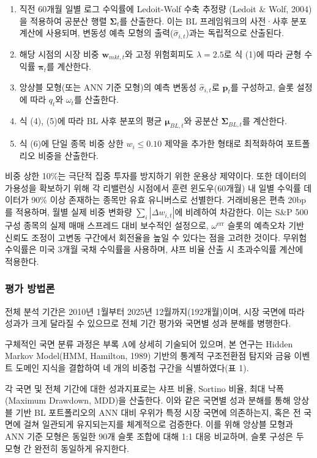\documentclass{article}
\begin{document}
\begin{enumerate}
  \item 직전 60개월 일별 로그 수익률에 Ledoit-Wolf 수축 추정량 (Ledoit & Wolf, 2004)을 적용하여 공분산 행렬 $\boldsymbol{\Sigma}_t$를 산출한다. 이는 BL 프레임워크의 사전·사후 분포 계산에 사용되며, 변동성 예측 모형의 출력($\hat{\sigma}_{i,t}$)과는 독립적으로 산출된다.
  \item 해당 시점의 시장 비중 $\mathbf{w}_{mkt,t}$와 고정 위험회피도 $\lambda = 2.5$로 식 (1)에 따라 균형 수익률 $\boldsymbol{\pi}_t$를 계산한다.
  \item 앙상블 모형(또는 ANN 기준 모형)의 예측 변동성 $\hat{\sigma}_{i,t}$로 $\mathbf{p}_t$를 구성하고, 슬롯 설정에 따라 $q_t$와 $\omega_t$를 산출한다.
  \item 식 (4), (5)에 따라 BL 사후 분포의 평균 $\boldsymbol{\mu}_{BL,t}$와 공분산 $\boldsymbol{\Sigma}_{BL,t}$를 계산한다.
  \item 식 (6)에 단일 종목 비중 상한 $w_i \leq 0.10$ 제약을 추가한 형태로 최적화하여 포트폴리오 비중을 산출한다.
\end{enumerate}

비중 상한 10\%는 극단적 집중 투자를 방지하기 위한 운용상 제약이다. 또한 데이터의 가용성을 확보하기 위해 각 리밸런싱 시점에서 훈련 윈도우(60개월) 내 일별 수익률 데이터가 90\% 이상 존재하는 종목만 유효 유니버스로 선별한다. 거래비용은 편측 20bp를 적용하며, 월별 실제 비중 변화량 $\sum_i |\Delta w_{i,t}|$에 비례하여 차감한다. 이는 S\&P 500 구성 종목의 실제 매매 스프레드 대비 보수적인 설정으로, $\omega^{\mathrm{err}}$ 슬롯의 예측오차 기반 신뢰도 조정이 고변동 구간에서 회전율을 높일 수 있다는 점을 고려한 것이다. 무위험 수익률은 미국 3개월 국채 수익률을 사용하며, 샤프 비율 산출 시 초과수익률 계산에 적용한다.

\subsubsection{평가 방법론}
\label{subsubsec:bl_eval}

전체 분석 기간은 2010년 1월부터 2025년 12월까지(192개월)이며, 시장 국면에 따라 성과가 크게 달라질 수 있으므로 전체 기간 평가와 국면별 성과 분해를 병행한다.

구체적인 국면 분류 과정은 부록 A에 상세히 기술되어 있으며, 본 연구는 Hidden Markov Model(HMM, Hamilton, 1989) 기반의 통계적 구조전환점 탐지와 금융 이벤트 도메인 지식을 결합하여 네 개의 비중첩 구간을 식별하였다(표 1).

각 국면 및 전체 기간에 대한 성과지표로는 샤프 비율, Sortino 비율, 최대 낙폭(Maximum Drawdown, MDD)을 산출한다. 이와 같은 국면별 성과 분해를 통해 앙상블 기반 BL 포트폴리오의 ANN 대비 우위가 특정 시장 국면에 의존하는지, 혹은 전 국면에 걸쳐 일관되게 유지되는지를 체계적으로 검증한다. 이를 위해 앙상블 모형과 ANN 기준 모형은 동일한 90개 슬롯 조합에 대해 1:1 대응 비교하며, 슬롯 구성은 두 모형 간 완전히 동일하게 유지한다.
\end{document}
